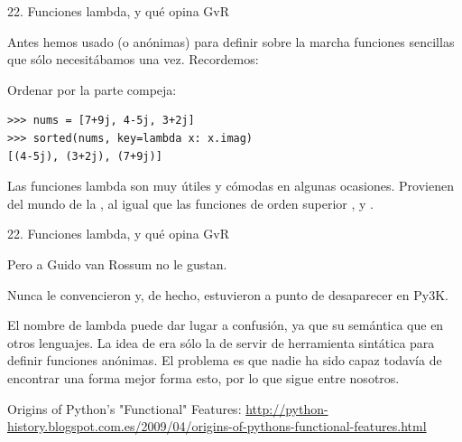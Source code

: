 \documentclass[14pt]{beamer}
\begin{document}
\begin{frame}[fragile]{22. \large Funciones lambda, y qué opina GvR}
  \small
  \begin{center}
    Antes hemos usado  (o anónimas) para
    definir sobre la marcha funciones sencillas que sólo necesitábamos
    una vez. Recordemos:
  \end{center}

  \footnotesize
  \begin{exampleblock}
    {Ordenar por la parte compeja:}
    \begin{lstlisting}
>>> nums = [7+9j, 4-5j, 3+2j]
>>> sorted(nums, key=lambda x: x.imag)
[(4-5j), (3+2j), (7+9j)]
    \end{lstlisting}
  \end{exampleblock}

  \small
  \begin{block}{}
    \centering
    Las funciones lambda son muy útiles y cómodas en algunas
    ocasiones.  Provienen del mundo de la , al igual que las funciones de orden superior
    ,  y .
  \end{block}
\end{frame}

\begin{frame}[fragile]{22. \large Funciones lambda, y qué opina GvR}
  \begin{alertblock}{}
    \large
    \centering
    Pero a Guido van Rossum no le gustan.
  \end{alertblock}

  \small
  \begin{center}
    Nunca le convencieron y, de hecho, estuvieron a punto de desaparecer en Py3K.
  \end{center}

  \footnotesize
  \begin{center}
    El nombre de lambda puede dar lugar a confusión, ya que su
    semántica  que en otros lenguajes. La
    idea de  era sólo la de servir de herramienta
    sintática para definir funciones anónimas. El problema es que
    nadie ha sido capaz todavía de encontrar una forma mejor forma
    esto, por lo que  sigue entre nosotros.
   \end{center}

  \begin{block}
    {\centering Origins of Python's "Functional" Features:}
    \centering \url{http://python-history.blogspot.com.es/2009/04/origins-of-pythons-functional-features.html}
  \end{block}
\end{frame}
\end{document}
